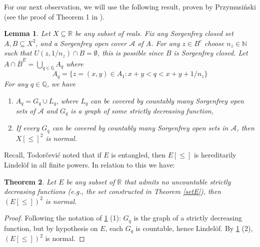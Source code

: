 \documentclass[11pt]{amsart}
\newtheorem{theorem}{Theorem}[section]
\newtheorem{lemma}[theorem]{Lemma}
\theoremstyle{definition}
\theoremstyle{remark}
\newcommand{\R}{\mathbb{R}}
\newcommand{\Q}{\mathbb{Q}}
\newcommand{\Aa}{\mathcal{A}}
\theoremstyle{plain}
\newcommand{\N}{\mathbb{N}}
\begin{document}
For our next observation, we will use the following result, proven by Przymusi\'nski (see the proof of Theorem 1 in \cite{T.Przymusinski1973}). 
\begin{lemma}\label{lem:przymusinski}
    Let $X\subseteq \R$ be any subset of reals. Fix any Sorgenfrey closed set $A,B \subseteq X^2$, and a Sorgenfrey open cover $\Aa$ of $A$. For any $z\in B^c$ choose $n_z\in \N$ such that $U(z,1/n_z)\cap B=\emptyset$, this is possible since $B$ is Sorgenfrey closed. Let $A\cap \overline{B}^E=\bigcup_{q\in\Q}A_q$ where
    \[A_q=\{ z=(x,y)\in A_1:x+y<q<x+y+1/n_z \}\]
    For any $q\in \Q$, we have
    \begin{enumerate}[label=(\arabic*)]
        \item $A_q= G_q \cup L_q$, where $L_q$ can be covered by countably many Sorgenfrey open sets of $\Aa$ and $G_q$ is a graph of some strictly decreasing function, 
        \item If every $G_q$ can be covered by countably many Sorgenfrey open sets in $\Aa$, then $X[\leq]^2$ is normal.
    \end{enumerate}
\end{lemma}
Recall, Todor\v cevi\'c noted \cite{Todorcevic1989} that if $E$ is entangled, then $E[\leq]$ is hereditarily Lindel\"of in all finite powers. In relation to this we have: 
\begin{theorem}\label{thm:E^2normal}
    Let $E$ be any subset of ${\mathbb R}$ that admits no uncountable strictly decreasing functions (e.g., the set constructed in Theorem \ref{setE}), then $(E[\leq])^2$ is normal.
\end{theorem}
\begin{proof}
    Following the notation of \ref{lem:przymusinski} (1): $G_q$ is the graph of a strictly decreasing function, but by hypothesis on $E$, each $G_q$ is countable, hence Lindel\"of. By \ref{lem:przymusinski} (2), $(E[\leq])^2$ is normal.  
\end{proof}
\end{document}
